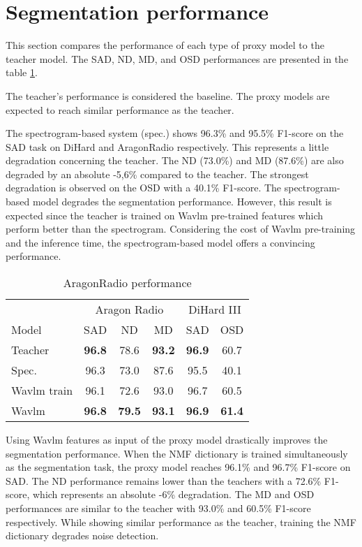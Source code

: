 \section{Segmentation performance}
\label{sect:perf}

This section compares the performance of each type of proxy model to the teacher model.
The SAD, ND, MD, and OSD performances are presented in the table \ref*{tab:seg_results}.

The teacher's performance is considered the baseline.
The proxy models are expected to reach similar performance as the teacher.

The spectrogram-based system (spec.) shows 96.3\% and 95.5\% F1-score on the SAD task on DiHard and AragonRadio respectively.
This represents a little degradation concerning the teacher.
The ND (73.0\%) and MD (87.6\%) are also degraded by an absolute -5,6\% compared to the teacher.
The strongest degradation is observed on the OSD with a 40.1\% F1-score.
The spectrogram-based model degrades the segmentation performance.
However, this result is expected since the teacher is trained on Wavlm pre-trained features which perform better than the spectrogram.
Considering the cost of Wavlm pre-training and the inference time, the spectrogram-based model offers a convincing performance.

\begin{table}[ht]
    \centering
    \begin{tabular}{lccccc}
        \toprule
         & \multicolumn{3}{c}{Aragon Radio} & \multicolumn{2}{c}{DiHard III} \\
         \cmidrule{2-4}
         \cmidrule{5-6}
         Model & SAD & ND & MD & SAD & OSD \\  
         \midrule
         Teacher & \textbf{96.8} & 78.6 & \textbf{93.2} & \textbf{96.9} & 60.7\\
         \midrule
         Spec. & 96.3 & 73.0 &  87.6 & 95.5 & 40.1\\
         Wavlm train & 96.1 & 72.6 & 93.0 & 96.7 & 60.5\\
         Wavlm & \textbf{96.8} & \textbf{79.5} & \textbf{93.1} & \textbf{96.9} & \textbf{61.4} \\
         \bottomrule
    \end{tabular}
    \caption{AragonRadio performance}
    \label{tab:seg_results}
\end{table}

Using Wavlm features as input of the proxy model drastically improves the segmentation performance.
When the NMF dictionary is trained simultaneously as the segmentation task, the proxy model reaches 96.1\% and 96.7\% F1-score on SAD.
The ND performance remains lower than the teachers with a 72.6\% F1-score, which represents an absolute -6\% degradation.
The MD and OSD performances are similar to the teacher with 93.0\% and 60.5\% F1-score respectively.
While showing similar performance as the teacher, training the NMF dictionary degrades noise detection.

